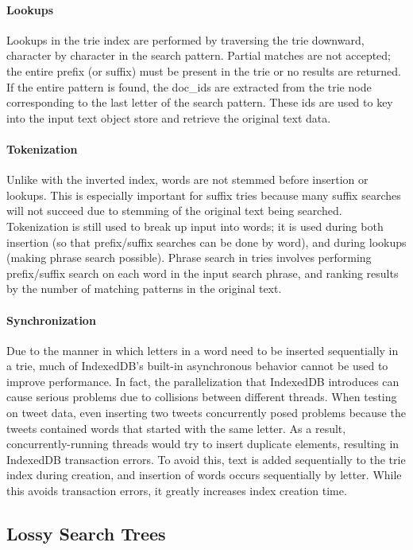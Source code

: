 \documentclass{vldb}
\begin{document}
\paragraph{Lookups}
Lookups in the trie index are performed by traversing the trie downward, character by character in the search pattern. Partial matches are not accepted; the entire prefix (or suffix) must be present in the trie or no results are returned. If the entire pattern is found, the doc\_ids are extracted from the trie node corresponding to the last letter of the search pattern. These ids are used to key into the input text object store and retrieve the original text data.

\paragraph{Tokenization}
Unlike with the inverted index, words are not stemmed before insertion or lookups. This is especially important for suffix tries because many suffix searches will not succeed due to stemming of the original text being searched. Tokenization is still used to break up input into words; it is used during both insertion (so that prefix/suffix searches can be done by word), and during lookups (making phrase search possible). Phrase search in tries involves performing prefix/suffix search on each word in the input search phrase, and ranking results by the number of matching patterns in the original text. 

\paragraph{Synchronization}
Due to the manner in which letters in a word need to be inserted sequentially in a trie, much of IndexedDB's built-in asynchronous behavior cannot be used to improve performance. In fact, the parallelization that IndexedDB introduces can cause serious problems due to collisions between different threads. When testing on tweet data, even inserting two tweets concurrently posed problems because the tweets contained words that started with the same letter. As a result, concurrently-running threads would try to insert duplicate elements, resulting in IndexedDB transaction errors. To avoid this, text is added sequentially to the trie index during creation, and insertion of words occurs sequentially by letter. While this avoids transaction errors, it greatly increases index creation time.

\subsection{Lossy Search Trees}
\end{document}
